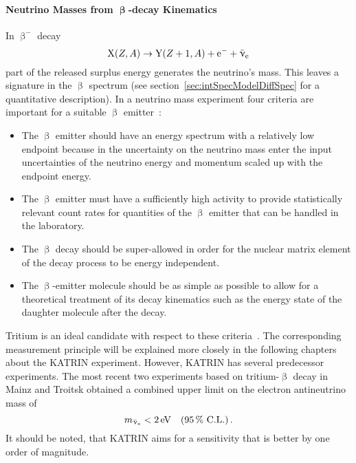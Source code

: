 \paragraph{Neutrino Masses from $\boldsymbol{\upbeta}$-decay Kinematics} 
In $\upbeta^-$ decay
\begin{equation}
    \ce{X}(Z,A) \rightarrow \ce{Y}(Z+1,A) + \ce{e^-} + \aeneutrino
\end{equation}
part of the released surplus energy generates the neutrino's mass. This leaves a signature in the $\upbeta$ spectrum (see section~\ref{sec:intSpecModelDiffSpec} for a quantitative description). In a neutrino mass experiment four criteria are important for a suitable $\upbeta$ emitter~\cite{Otten:2008zz}:
\begin{itemize}
	\item The $\upbeta$ emitter should have an energy spectrum with a relatively low endpoint because in the uncertainty on the neutrino mass enter the input uncertainties of the neutrino energy and	momentum scaled up with the endpoint energy.
	\item The $\upbeta$ emitter must have a sufficiently high activity to provide statistically relevant count rates for quantities of the $\upbeta$ emitter that can be handled in the laboratory.
	\item The $\upbeta$ decay should be super-allowed in order for the nuclear matrix element of the decay process to be energy independent.
	\item The $\upbeta$-emitter molecule should be as simple as possible to allow for a theoretical treatment of its decay kinematics such as the energy state of the daughter molecule after the decay.
\end{itemize}
Tritium is an ideal candidate with respect to these criteria~\cite{Otten:2008zz}. The corresponding measurement principle will be explained more closely in the following chapters about the KATRIN experiment. However, KATRIN has several predecessor experiments. The most recent two experiments based on tritium-$\upbeta$ decay in Mainz and Troitsk obtained a combined upper limit on the electron antineutrino mass of~\cite{Kraus2005, Aseev:2011dq, ReviewOfParticlePhysics}
\begin{equation*}
    m_{\bar{\upnu}_{\mathrm{e}}} < \SI{2}{eV} \quad (\SI{95}{\percent} \text{ C.L.}) \text{\,.} 
\end{equation*}
It should be noted, that KATRIN aims for a sensitivity that is better by one order of magnitude.
\FloatBarrier
